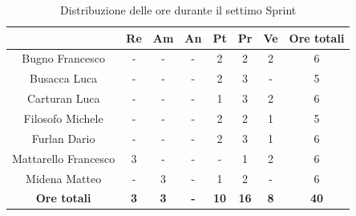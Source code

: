 \begin{table}[H]
  \centering
  \renewcommand{\arraystretch}{1.8}
  \begin{tabular}{c|c|c|c|c|c|c|c}
    \rowcolor[HTML]{125E28}
    \multicolumn{1}{c}{\color[HTML]{FFFFFF}\textbf{ Nominativo }}
                         & \multicolumn{1}{c}{\color[HTML]{FFFFFF}\textbf{ Re }}
                         & \multicolumn{1}{c}{\color[HTML]{FFFFFF}\textbf{ Am}}
                         & \multicolumn{1}{c}{\color[HTML]{FFFFFF}\textbf{ An }}
                         & \multicolumn{1}{c}{\color[HTML]{FFFFFF}\textbf{ Pt }}
                         & \multicolumn{1}{c}{\color[HTML]{FFFFFF}\textbf{ Pr }}
                         & \multicolumn{1}{c}{\color[HTML]{FFFFFF}\textbf{ Ve }}
                         & \multicolumn{1}{c}{\color[HTML]{FFFFFF}\textbf{ Ore totali }}                                                                                  \\
    \hline
    Bugno Francesco      & -                                                             & -          & -          & 2           & 2           & 2          & 6           \\
    Busacca Luca         & -                                                             & -          & -          & 2           & 3           & -          & 5           \\
    Carturan Luca        & -                                                             & -          & -          & 1           & 3           & 2          & 6           \\
    Filosofo Michele     & -                                                             & -          & -          & 2           & 2           & 1          & 5           \\
    Furlan Dario         & -                                                             & -          & -          & 2           & 3           & 1          & 6           \\
    Mattarello Francesco & 3                                                             & -          & -          & -           & 1           & 2          & 6           \\
    Midena Matteo        & -                                                             & 3          & -          & 1           & 2           & -          & 6           \\
    \textbf{Ore totali}  & \textbf{3}                                                    & \textbf{3} & \textbf{-} & \textbf{10} & \textbf{16} & \textbf{8} & \textbf{40}
  \end{tabular}
  \caption{Distribuzione delle ore durante il settimo Sprint}
\end{table}

